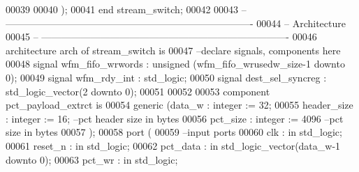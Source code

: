 \begin{DoxyCode}
00039         
00040         \textcolor{vhdlchar}{)};
00041 \textcolor{keywordflow}{end} \textcolor{vhdlchar}{stream\_switch};
00042 
00043 \textcolor{keyword}{-- ----------------------------------------------------------------------------}
00044 \textcolor{keyword}{-- Architecture}
00045 \textcolor{keyword}{-- ----------------------------------------------------------------------------}
00046 \textcolor{keywordflow}{architecture} arch \textcolor{keywordflow}{of} stream_switch is
00047 \textcolor{keyword}{--declare signals,  components here}
00048 \textcolor{keywordflow}{signal} \textcolor{vhdlchar}{wfm_fifo_wrwords}                     \textcolor{vhdlchar}{:} \textcolor{comment}{unsigned} \textcolor{vhdlchar}{(}\textcolor{vhdlchar}{wfm_fifo_wrusedw_size}\textcolor{vhdlchar}{-}\textcolor{vhdllogic}{}\textcolor{vhdllogic}{1} \textcolor{keywordflow}{downto} \textcolor{vhdllogic}{}\textcolor{vhdllogic}{0}\textcolor{vhdlchar}{)};
00049 \textcolor{keywordflow}{signal} \textcolor{vhdlchar}{wfm_rdy_int}                          \textcolor{vhdlchar}{:} \textcolor{comment}{std\_logic};
00050 \textcolor{keywordflow}{signal} \textcolor{vhdlchar}{dest_sel_syncreg}                     \textcolor{vhdlchar}{:} \textcolor{comment}{std\_logic\_vector}\textcolor{vhdlchar}{(}\textcolor{vhdllogic}{}\textcolor{vhdllogic}{2} \textcolor{keywordflow}{downto} \textcolor{vhdllogic}{}\textcolor{vhdllogic}{0}\textcolor{vhdlchar}{)};
00051 
00052 
00053 \textcolor{keywordflow}{component} pct_payload_extrct \textcolor{keywordflow}{is}
00054     \textcolor{keywordflow}{generic} (data_w         : \textcolor{comment}{integer} := \textcolor{vhdllogic}{}\textcolor{vhdllogic}{32};
00055                 header_size     : \textcolor{comment}{integer} := \textcolor{vhdllogic}{}\textcolor{vhdllogic}{16}; \textcolor{keyword}{--pct header size in bytes }
00056                 pct_size            : \textcolor{comment}{integer} := \textcolor{vhdllogic}{}\textcolor{vhdllogic}{4096}\textcolor{keyword}{ --pct size in bytes}
00057         );
00058   \textcolor{keywordflow}{port} (
00059 \textcolor{keyword}{      --input ports }
00060         clk                 : \textcolor{keywordflow}{in} \textcolor{comment}{std\_logic};
00061         reset_n             : \textcolor{keywordflow}{in} \textcolor{comment}{std\_logic};
00062         pct_data                : \textcolor{keywordflow}{in} \textcolor{comment}{std\_logic\_vector}(data_w\textcolor{vhdlchar}{-}\textcolor{vhdllogic}{}\textcolor{vhdllogic}{1} \textcolor{keywordflow}{downto} \textcolor{vhdllogic}{}\textcolor{vhdllogic}{0});
00063         pct_wr              : \textcolor{keywordflow}{in} \textcolor{comment}{std\_logic};

\end{DoxyCode}
